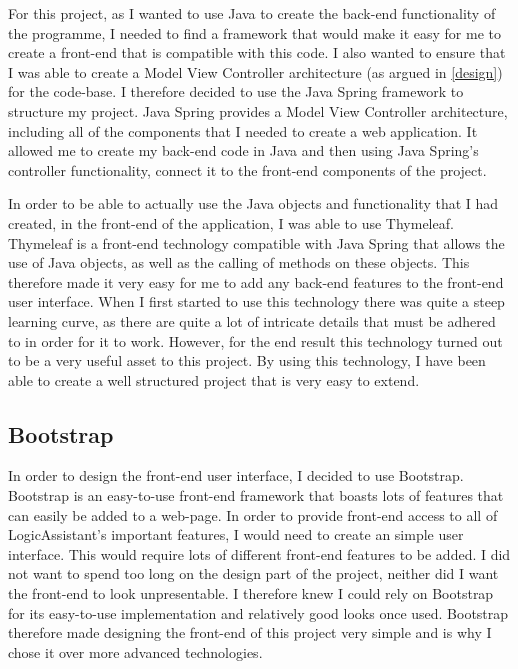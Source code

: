 For this project, as I wanted to use Java to create the back-end functionality of the programme, I needed to find a framework that would make it easy for me to create a front-end that is compatible with this code. I also wanted to ensure that I was able to create a Model View Controller architecture (as argued in \ref{design}) for the code-base. I therefore decided to use the Java Spring framework to structure my project. Java Spring provides a Model View Controller architecture, including all of the components that I needed to create a web application. It allowed me to create my back-end code in Java and then using Java Spring's controller functionality, connect it to the front-end components of the project. 

In order to be able to actually use the Java objects and functionality that I had created, in the front-end of the application, I was able to use Thymeleaf. Thymeleaf is a front-end technology compatible with Java Spring that allows the use of Java objects, as well as the calling of methods on these objects. This therefore made it very easy for me to add any back-end features to the front-end user interface. When I first started to use this technology there was quite a steep learning curve, as there are quite a lot of intricate details that must be adhered to in order for it to work. However, for the end result this technology turned out to be a very useful asset to this project. By using this technology, I have been able to create a well structured project that is very easy to extend.

\subsection{Bootstrap \label{bootstrap}}
In order to design the front-end user interface, I decided to use Bootstrap. Bootstrap is an easy-to-use front-end framework that boasts lots of features that can easily be added to a web-page. In order to provide front-end access to all of LogicAssistant's important features, I would need to create an simple user interface. This would require lots of different front-end features to be added. I did not want to spend too long on the design part of the project, neither did I want the front-end to look unpresentable. I therefore knew I could rely on Bootstrap for its easy-to-use implementation and relatively good looks once used. Bootstrap therefore made designing the front-end of this project very simple and is why I chose it over more advanced technologies.

